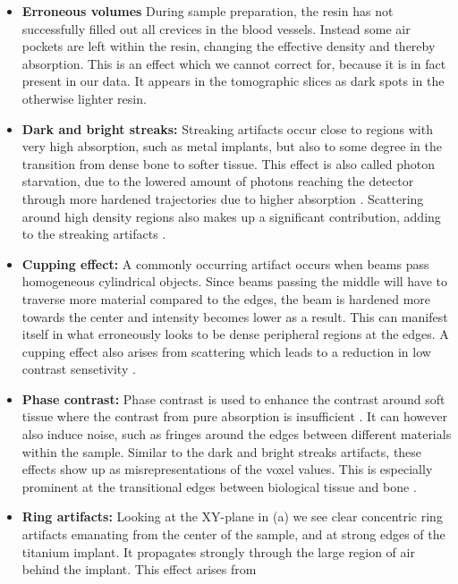 \begin{itemize}
  \item \textbf{Erroneous volumes} During sample preparation, the resin has not
	successfully filled out all crevices in the blood vessels. Instead
	some air pockets are left within the resin, changing the
	effective density and thereby absorption. This is an effect
	which we cannot correct for, because it is in fact present in
	our data. It appears in the tomographic slices
	 as dark spots in the otherwise lighter resin. 
  \item \textbf{Dark and bright streaks:} Streaking artifacts occur close to
	regions with very high absorption, such as metal implants, but also
	to some degree in the transition from dense bone to softer
	tissue.  This effect is also called photon starvation, due to
	the lowered amount of photons reaching the detector through
	more hardened trajectories due to higher absorption
	\citep{srnoise}. Scattering around high density regions also
	makes up a significant contribution, adding to the streaking
	artifacts \citep{scatter_sr_ct}.
  \item \textbf{Cupping effect:} A commonly occurring artifact occurs when
	beams pass homogeneous cylindrical objects. Since beams passing the
	middle will have to traverse more material compared to the
	edges, the beam is hardened more towards the center and
	intensity becomes lower as a result. This can manifest itself
	in what erroneously looks to be dense peripheral regions at the
	edges. A cupping effect also arises from scattering which leads
	to a reduction in low contrast sensetivity \citep{sr_streak_artifact_scatter}.
  \item \textbf{Phase contrast:} Phase contrast is used to enhance the contrast
	around soft tissue where the contrast from pure absorption is
	insufficient \citep{phasecontrast}. It can however also induce
	noise, such as fringes around the edges between different
	materials within the sample\citep{srnoise}. Similar to the dark
	and bright streaks artifacts, these effects show up as
	misrepresentations of the voxel values. This is especially
	prominent at the transitional edges between biological tissue
	and bone \citep{sr_streak_artifacts_scatter}.
  \item \textbf{Ring artifacts:} Looking at the XY-plane in
	 (a) we see clear concentric ring artifacts emanating
	from the center of the sample, and at strong edges of the
	titanium implant. It propagates strongly through the large
	region of air behind the implant. This effect arises from

\end{itemize}

